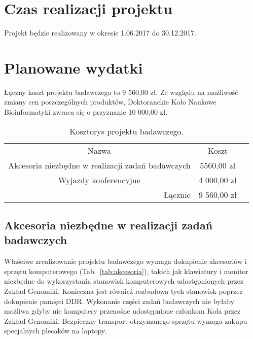 \documentclass{article}
\begin{document}
\section{Czas realizacji projektu}

Projekt będzie realizowany w okresie 1.06.2017 do 30.12.2017.

\section{Planowane wydatki}

Łączny koszt projektu badawczego to 9 560,00 zł. Ze względu na możliwość zmiany 
cen poszczególnych produktów, Doktoranckie Koło Naukowe Bioinformatyki zwraca 
się o przyznanie 10 000,00 zł.

\begin{table}[!htbp]
\centering
\caption{Kosztorys projektu badawczego.}
\begin{tabular}{rrr}
\cline{1-2}
\multicolumn{1}{|c}{Nazwa}                                   & \multicolumn{1}{|c|}{Koszt}   &  \\ \cline{1-2}
\multicolumn{1}{|c}{Akcesoria niezbędne w realizacji zadań badawczych}   & 
\multicolumn{1}{|c|}{5560,00 zł} &  \\ \cline{1-2}
\multicolumn{1}{|c}{Wyjazdy konferencyjne}   & 
\multicolumn{1}{|c|}{4 000,00 zł} &  \\ \cline{1-2}
Łącznie    & 9 560,00 zł                    & 
\end{tabular}
\end{table}

\subsection{Akcesoria niezbędne w realizacji zadań badawczych}

Właściwe zrealizowanie projektu badawczego wymaga dokupienie akcesoriów i 
sprzętu komputerowego (Tab.~\ref{tab:akcesoria}), takich jak klawiatury i 
monitor niezbędne do wykorzystania stanowisk komputerowych udostępnionych przez 
Zakład Genomiki. Konieczna jest również rozbudowa tych stanowisk poprzez 
dokupienie pamięci DDR. Wykonanie części zadań badawczych nie byłaby możliwa 
gdyby nie komputery przenośne udostępnione członkom Koła przez Zakład Genomiki. 
Bezpieczny transport otrzymanego sprzętu wymaga zakupu specjalnych plecaków na 
laptopy.
\end{document}
